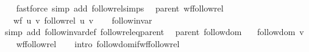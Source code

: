 \begin{isabellebody}
\endisataginvisible
{\isafoldinvisible}%
%
\isadeliminvisible
\isanewline
%
\endisadeliminvisible
%
\isadelimproof
\ \ %
\endisadelimproof
%
\isatagproof
{}\isamarkupfalse%
\ {\isacharparenleft}{\kern0pt}fastforce\ simp\ add{\isacharcolon}{\kern0pt}\ follow{\isacharunderscore}{\kern0pt}rel{\isachardot}{\kern0pt}simps{\isacharparenright}{\kern0pt}%
\endisatagproof
{\isafoldproof}%
%
\isadelimproof
\isanewline
%
\endisadelimproof
%
\isadeliminvisible
\isanewline
%
\endisadeliminvisible
%
\isataginvisible
{}\isamarkupfalse%
\ {\isacharparenleft}{\kern0pt}\ parent{\isacharparenright}{\kern0pt}\ wf{\isacharunderscore}{\kern0pt}follow{\isacharunderscore}{\kern0pt}rel{\isacharcolon}{\kern0pt}\isanewline
\ \ \ {\isachardoublequoteopen}wf\ {\isacharbraceleft}{\kern0pt}{\isacharparenleft}{\kern0pt}u{\isacharcomma}{\kern0pt}\ v{\isacharparenright}{\kern0pt}{\isachardot}{\kern0pt}\ follow{\isacharunderscore}{\kern0pt}rel\ u\ v{\isacharbraceright}{\kern0pt}{\isachardoublequoteclose}%
\endisataginvisible
{\isafoldinvisible}%
%
\isadeliminvisible
\isanewline
%
\endisadeliminvisible
%
\isadelimproof
\ \ %
\endisadelimproof
%
\isatagproof
{}\isamarkupfalse%
\ follow{\isacharunderscore}{\kern0pt}invar\isanewline
\ \ \isamarkupfalse%
\ {\isacharparenleft}{\kern0pt}simp\ add{\isacharcolon}{\kern0pt}\ follow{\isacharunderscore}{\kern0pt}invar{\isacharunderscore}{\kern0pt}def\ follow{\isacharunderscore}{\kern0pt}rel{\isacharunderscore}{\kern0pt}eq{\isacharunderscore}{\kern0pt}parent{\isacharparenright}{\kern0pt}%
\endisatagproof
{\isafoldproof}%
%
\isadelimproof
\isanewline
%
\endisadelimproof
%
\isadeliminvisible
\isanewline
%
\endisadeliminvisible
%
\isataginvisible
{}\isamarkupfalse%
\ {\isacharparenleft}{\kern0pt}\ parent{\isacharparenright}{\kern0pt}\ follow{\isacharunderscore}{\kern0pt}dom{\isacharcolon}{\kern0pt}\isanewline
\ \ \ {\isachardoublequoteopen}follow{\isacharunderscore}{\kern0pt}dom\ v{\isachardoublequoteclose}%
\endisataginvisible
{\isafoldinvisible}%
%
\isadeliminvisible
\isanewline
%
\endisadeliminvisible
%
\isadelimproof
\ \ %
\endisadelimproof
%
\isatagproof
{}\isamarkupfalse%
\ wf{\isacharunderscore}{\kern0pt}follow{\isacharunderscore}{\kern0pt}rel\isanewline
\ \ \isamarkupfalse%
\ {\isacharparenleft}{\kern0pt}intro\ follow{\isacharunderscore}{\kern0pt}dom{\isacharunderscore}{\kern0pt}if{\isacharunderscore}{\kern0pt}wf{\isacharunderscore}{\kern0pt}follow{\isacharunderscore}{\kern0pt}rel{\isacharparenright}{\kern0pt}%

\end{isabellebody}
